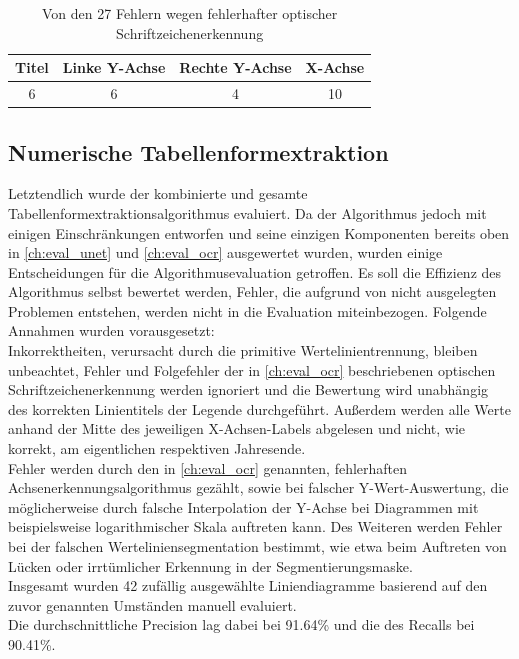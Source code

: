 \begin{table}[H]
    \centering
    \begin{tabular}{|c|c|c|c|}
        \hline
        \rowcolor[HTML]{EFEFEF}
        Titel & Linke Y-Achse & Rechte Y-Achse & X-Achse \\ \hline
        6     & 6             & 4              & 10      \\ \hline
    \end{tabular}
    \caption{Von den 27 Fehlern wegen fehlerhafter optischer Schriftzeichenerkennung}
    \label{tb:ocr2}
\end{table}

\subsection{Numerische Tabellenformextraktion}

Letztendlich wurde der kombinierte und gesamte Tabellenformextraktionsalgorithmus evaluiert. Da der Algorithmus jedoch mit einigen Einschränkungen entworfen und seine einzigen Komponenten bereits oben in \ref{ch:eval_unet} und \ref{ch:eval_ocr} ausgewertet wurden, wurden einige Entscheidungen für die Algorithmusevaluation getroffen. Es soll die Effizienz des Algorithmus selbst bewertet werden, Fehler, die aufgrund von nicht ausgelegten Problemen entstehen, werden nicht in die Evaluation miteinbezogen. Folgende Annahmen wurden vorausgesetzt:
\\
Inkorrektheiten, verursacht durch die primitive Wertelinientrennung, bleiben unbeachtet, Fehler und Folgefehler der in \ref{ch:eval_ocr} beschriebenen optischen Schriftzeichenerkennung werden ignoriert und die Bewertung wird unabhängig des korrekten Linientitels der Legende durchgeführt. Außerdem werden alle Werte anhand der Mitte des jeweiligen X-Achsen-Labels abgelesen und nicht, wie korrekt, am eigentlichen respektiven Jahresende.
\\
Fehler werden durch den in \ref{ch:eval_ocr} genannten, fehlerhaften Achsenerkennungsalgorithmus gezählt, sowie bei falscher Y-Wert-Auswertung, die möglicherweise durch falsche Interpolation der Y-Achse bei Diagrammen mit beispielsweise logarithmischer Skala auftreten kann. Des Weiteren werden Fehler bei der falschen Werteliniensegmentation bestimmt, wie etwa beim Auftreten von Lücken oder irrtümlicher Erkennung in der Segmentierungsmaske.
\\
Insgesamt wurden 42 zufällig ausgewählte Liniendiagramme basierend auf den zuvor genannten Umständen manuell evaluiert.
\\
Die durchschnittliche Precision lag dabei bei 91.64\% und die des Recalls bei 90.41\%.


